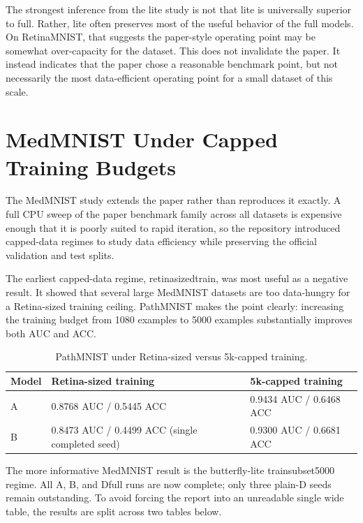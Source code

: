 \documentclass[11pt,a4paper]{article}
\def\texttt#1{#1}%
\def\_{}%
\begin{document}
The strongest inference from the lite study is not that lite is universally superior to full. Rather, lite often preserves most of the useful behavior of the full models. On RetinaMNIST, that suggests the paper-style operating point may be somewhat over-capacity for the dataset. This does not invalidate the paper. It instead indicates that the paper chose a reasonable benchmark point, but not necessarily the most data-efficient operating point for a small dataset of this scale.

\section{MedMNIST Under Capped Training Budgets}

The MedMNIST study extends the paper rather than reproduces it exactly. A full CPU sweep of the paper benchmark family across all datasets is expensive enough that it is poorly suited to rapid iteration, so the repository introduced capped-data regimes to study data efficiency while preserving the official validation and test splits.

The earliest capped-data regime, \texttt{retina\_sized\_train}, was most useful as a negative result. It showed that several large MedMNIST datasets are too data-hungry for a Retina-sized training ceiling. PathMNIST makes the point clearly: increasing the training budget from 1080 examples to 5000 examples substantially improves both AUC and ACC.

\begin{table}[tbp]
\centering
\caption{PathMNIST under Retina-sized versus 5k-capped training.}
\label{tab:pathmnist-cap}
\small
\begin{tabularx}{\textwidth}{L{2.0cm}Y Y}
\toprule
Model & Retina-sized training & 5k-capped training \\
\midrule
A & 0.8768 AUC / 0.5445 ACC & 0.9434 AUC / 0.6468 ACC \\
B & 0.8473 AUC / 0.4499 ACC (single completed seed) & 0.9300 AUC / 0.6681 ACC \\
\bottomrule
\end{tabularx}
\normalsize
\end{table}

The more informative MedMNIST result is the butterfly-lite \texttt{train\_subset\_5000} regime. All \texttt{A}, \texttt{B}, and \texttt{D\_full} runs are now complete; only three plain-\texttt{D} seeds remain outstanding. To avoid forcing the report into an unreadable single wide table, the results are split across two tables below.
\end{document}
